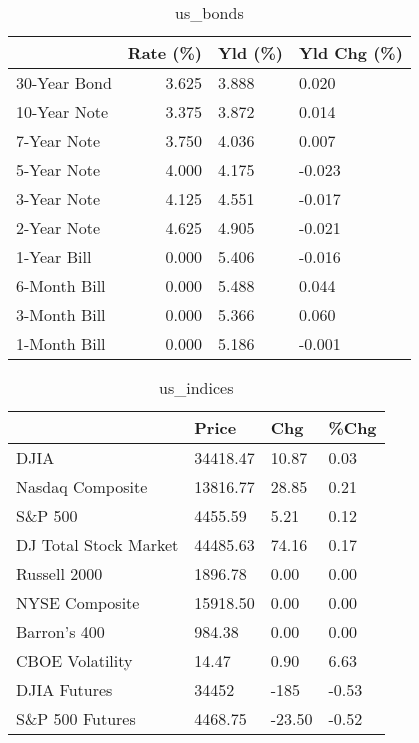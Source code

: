 \documentclass{article}%
\begin{document}
\begin{table}[htbp]%
\caption{us\_bonds}%
\centering%
\begin{adjustbox}{width=1\textwidth}%
\begin{tabular}{lrll}
\toprule
             &  Rate (\%) & Yld (\%) & Yld Chg (\%) \\
\midrule
30-Year Bond &     3.625 &   3.888 &       0.020 \\
10-Year Note &     3.375 &   3.872 &       0.014 \\
 7-Year Note &     3.750 &   4.036 &       0.007 \\
 5-Year Note &     4.000 &   4.175 &      -0.023 \\
 3-Year Note &     4.125 &   4.551 &      -0.017 \\
 2-Year Note &     4.625 &   4.905 &      -0.021 \\
 1-Year Bill &     0.000 &   5.406 &      -0.016 \\
6-Month Bill &     0.000 &   5.488 &       0.044 \\
3-Month Bill &     0.000 &   5.366 &       0.060 \\
1-Month Bill &     0.000 &   5.186 &      -0.001 \\
\bottomrule
\end{tabular}
%
\end{adjustbox}%
\end{table}

%


\begin{table}[htbp]%
\caption{us\_indices}%
\centering%
\begin{adjustbox}{width=1\textwidth}%
\begin{tabular}{llll}
\toprule
                      &    Price &    Chg &  \%Chg \\
\midrule
                 DJIA & 34418.47 &  10.87 &  0.03 \\
     Nasdaq Composite & 13816.77 &  28.85 &  0.21 \\
              S\&P 500 &  4455.59 &   5.21 &  0.12 \\
DJ Total Stock Market & 44485.63 &  74.16 &  0.17 \\
         Russell 2000 &  1896.78 &   0.00 &  0.00 \\
       NYSE Composite & 15918.50 &   0.00 &  0.00 \\
         Barron's 400 &   984.38 &   0.00 &  0.00 \\
      CBOE Volatility &    14.47 &   0.90 &  6.63 \\
         DJIA Futures &    34452 &   -185 & -0.53 \\
      S\&P 500 Futures &  4468.75 & -23.50 & -0.52 \\
\bottomrule
\end{tabular}
%
\end{adjustbox}%
\end{table}
\end{document}
